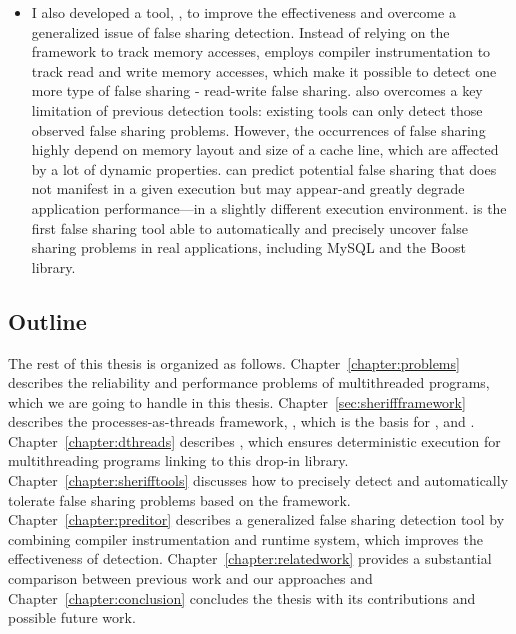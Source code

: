 \begin{itemize}
\item I also developed a tool, \predator{}, to improve the effectiveness and overcome a generalized issue of false sharing detection. Instead of relying on the \sheriff{} framework to track memory accesses, \predator{} employs compiler instrumentation to track read and write memory accesses, which make it possible to detect one more type of false sharing - read-write false sharing. \Predator{} also overcomes a key limitation of previous detection tools: existing tools can only detect those observed false sharing problems. However, the occurrences of false sharing highly depend on memory layout and size of a cache line, which are affected by a lot of dynamic properties. \Predator{} can predict potential false sharing that does not manifest in a given execution but may appear-and greatly degrade application performance—in a slightly different execution environment. \Predator{} is the first false sharing tool able to automatically and precisely uncover false sharing problems in real applications, including MySQL and the Boost library.


\end{itemize}

\subsection*{Outline}
The rest of this thesis is organized as follows. Chapter~\ref{chapter:problems} describes the reliability and performance problems of multithreaded programs, which we are going to handle in this thesis. Chapter~\ref{sec:sheriffframework} describes the processes-as-threads framework, \sheriff{}, which is the basis for \dthreads{}, \SheriffDetect{} and \SheriffProtect{}. Chapter~\ref{chapter:dthreads} describes \dthreads{}, which ensures deterministic execution for multithreading programs linking to this drop-in library. Chapter~\ref{chapter:sherifftools} discusses how to precisely detect and automatically tolerate false sharing problems based on the \sheriff{} framework. Chapter~\ref{chapter:preditor} describes a generalized false sharing detection tool by combining compiler instrumentation and runtime system, which improves the effectiveness of detection. 
Chapter~\ref{chapter:relatedwork} provides a substantial comparison between previous work and our approaches and Chapter~\ref{chapter:conclusion} concludes the thesis with its contributions and possible future work. 



